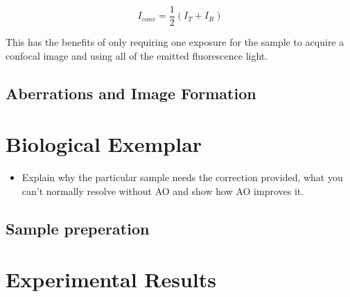 \begin{equation}\label{eq:conventional_image}
I_{conv} = \frac{1}{2}\left(I_{T} + I_{R}\right)
\end{equation}

This has the benefits of only requiring one exposure for the sample to acquire a confocal image and using all of the emitted fluorescence light.

	\subsection{Aberrations and Image Formation}
	\label{subsec:Aurox_aberrations}

\section{Biological Exemplar}
\label{sec:Aurox_biology}

	\begin{itemize}
		\item Explain why the particular sample needs the correction provided, what you can't normally resolve without AO and show how  AO improves it.
	\end{itemize}

	\subsection{Sample preperation}
	\label{subsec:Aurox_sample_prep}
	
\section{Experimental Results}
\label{sec:Aurox_results}
